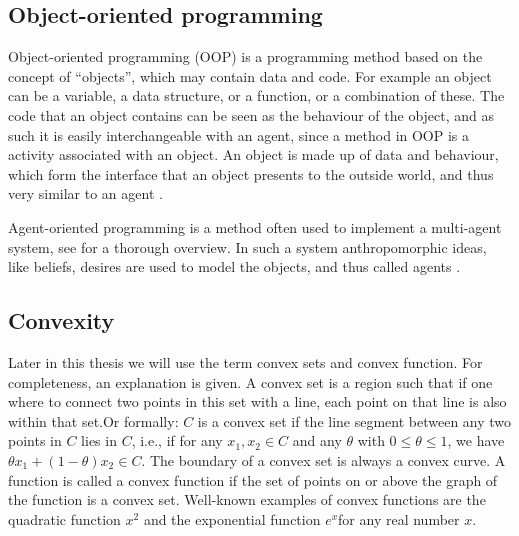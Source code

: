 \subsection{Object-oriented programming}

Object-oriented programming (OOP) is a programming method based on the concept of ``objects'', which may contain data and code. For example an object can be a variable, a data structure, or a function, or a combination of these. The code that an object contains can be seen as the behaviour of the object, and as such it is easily interchangeable with an agent, since a method in OOP is a activity associated with an object. An object is made up of data and behaviour, which form the interface that an object presents to the outside world, and thus very similar to an agent \citep{shoham1993agent}. 

Agent-oriented programming is a method often used to implement a multi-agent system, see \citep{mahar2012agent} for a thorough overview. In such a system anthropomorphic ideas, like beliefs, desires are used to model the objects, and thus called agents \citep{shoham1993agent}.%

% 


\subsection{Convexity}
\label{sec:convex}
Later in this thesis we will use the term convex sets and convex function. For completeness, an explanation is given. A convex set is a region such that if one where to connect two points in this set with a line, each point on that line is also within that set.Or formally: $C$ is a convex set if the line segment between any two points in $C$ lies in $C$, i.e., if for any $x_1, x_2 \in C$ and any $\theta$ with $0 \leq \theta \leq 1$, we have $\theta x_1 + (1 − \theta )x_2 \in C$. %
The boundary of a convex set is always a convex curve. A function is called a convex function if the set of points on or above the graph of the function is a convex set. Well-known examples of convex functions are the quadratic function $x^{2}$ and the exponential function $e^{x} $for any real number $x$.

